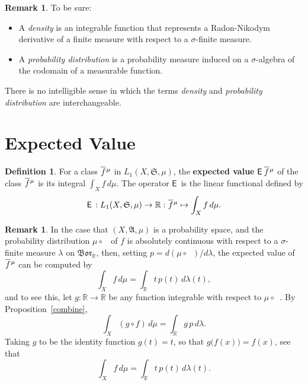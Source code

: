 \documentclass[
twoside=true,
paper=letter,
fontsize=9pt,
pagesize=auto,
leqno,
openany,
headsepline,
overfullrule,
]{scrbook}
\theoremstyle{plain}
\theoremstyle{plain}
\theoremstyle{definition}
\newtheorem{defn}[thm]{Definition}
\newtheorem{rmk}[thm]{Remark}
\theoremstyle{bfnoteitalic}
\theoremstyle{bfnoteroman}
\newcommand{\term}[1]{\textbf{#1}\index{#1}}
\newcommand{\sigalg}[1]{\mathfrak{#1}}
\newcommand{\sfop}[1]{\mathsf{#1}}
\newcommand{\expval}{\sfop{E}\,}
\newcommand{\borel}{\mathfrak{Bor}}
\newcommand{\textsigma}{\hbox{\large{$\sigma$}}\kern-1pt}
\newcommand{\preimage}[1]{\mathop{#1^{\leftarrow}}}
\newcommand{\R}{\mathbb{R}}
\newcommand{\semiring}{\sigalg{S}}
\newcommand{\sigmaalgebra}{\sigalg{A}}
\newcommand{\funcf}{f}
\newcommand{\funcg}{g}
\newcommand{\function}{f}
\newcommand{\measurespace}{X}
\newcommand{\measure}{\mu}
\newcommand{\measmu}{\mu}
\newcommand{\measlambda}{\lambda}
\newcommand*\xbar[1]{%
   \hbox{%
     \vbox{%
       \hrule height 0.4pt %
       \kern0.4ex%
       \hbox{%
         \ensuremath{#1}%
       }%
     }%
   }%
}
\newcommand{\lebclass}[1]{\hspace{.5pt}\xbar{#1}\hspace{0.5pt}}
\newcommand{\ellclass}[2]{\lebclass{#1}^{#2}}
\begin{document}
\begin{rmk}
To be sure:
\begin{itemize}
\item A \emph{density} is an integrable function that represents a Radon-Nikodym derivative of a finite measure with respect to  a \textsigma-finite measure.
\item A \emph{probability distribution} is a probability measure induced on a \textsigma-algebra of the codomain of a measurable function.
\end{itemize}
There is no intelligible sense in which the terms \emph{density} and \emph{probability distribution} are interchangeable.
\end{rmk}


\section{Expected Value}
\begin{defn}\label{expected_value}
For a class $\ellclass{\function}{\measure}$ in $L_1(\measurespace, \semiring,\measure)$, the
\term{expected value} $\expval{\ellclass{\function}{\measure}}$ of the class
$\ellclass{\function}{\measure}$ is its integral
$\int_\measurespace\function\,d\mu$.
The operator $\expval$ is the linear functional defined by
\[
\expval:
L_1(\measurespace, \semiring,\measure)\to\R :
\ellclass{\function}{\measure}\mapsto \int_\measurespace \function\, d\measure.
\]
\end{defn}



\begin{rmk}\label{expected_value_probability}
In the case that
$(\measurespace,\sigmaalgebra,\measure)$ is a probability space, and
the probability distribution
$\measmu\circ\preimage{\funcf}$ of $\funcf$ is absolutely continuous with respect to a
\textsigma\hyp{}finite measure
$\measlambda$ on $\borel_\R$, then,
setting
$p = d(\measmu\circ\preimage{\funcf})/d \measlambda$,
the expected value of $\ellclass{\funcf}{\measure}$ can be computed by
\[
\int_\measurespace \funcf \, d\measmu
=
\int_\R t \, p(t) \, d\measlambda(t),
\]
and to see this, let $\funcg:\R \to\R$ be any function integrable with respect to
$\measmu\circ\preimage{\funcf}$.  By Proposition~\ref{combine},
\[
\int_\measurespace (\funcg \circ \funcf)\, d\measmu
=
\int_\R \funcg \, p \, d\measlambda.
\]
Taking $\funcg$ to be the identity function $\funcg(t)=t$, so that
$\funcg \bigl( \funcf(x)\bigr) = \funcf(x)$, see that
\[
\int_\measurespace \funcf \, d\measmu
=
\int_\R t \, p(t) \, d\measlambda(t).
\]
\end{rmk}
\end{document}
